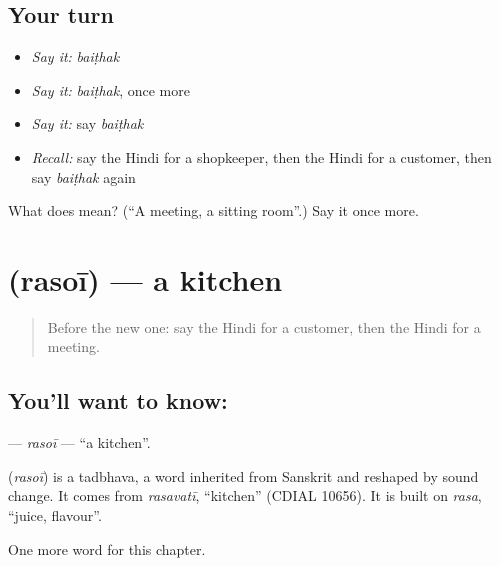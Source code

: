 \subsection*{Your turn}
\begin{itemize}
\raggedright
  \item \emph{Say it:} \emph{baiṭhak}
  \item \emph{Say it:} \emph{baiṭhak}, once more
  \item \emph{Say it:} say \emph{baiṭhak}
  \item \emph{Recall:} say the Hindi for a shopkeeper, then the Hindi for a customer, then say \emph{baiṭhak} again
\end{itemize}

\begin{tcolorbox}[breakable,colback=teal!4,colframe=teal!35!black,title={Before you move on}]
What does  mean? (\textquotedblleft{}A meeting, a sitting room\textquotedblright{}.) Say it once more.
\end{tcolorbox}
\section[\texorpdfstring{\hi{रसोई} (rasoī)}{रसोई (rasoī)}]{ (rasoī) — a kitchen}

\label{lesson:HI-C183-rasoi}



\begin{quote}
Before the new one: say the Hindi for a customer, then the Hindi for a meeting.
\end{quote}

\subsection*{You'll want to know: }
\textbf{} — \emph{rasoī} — \textquotedblleft{}a kitchen\textquotedblright{}.

\begin{cousinweb}
\textbf{} (\emph{rasoī}) is a tadbhava, a word inherited from Sanskrit and reshaped by sound change. It comes from \emph{rasavatī}, \textquotedblleft{}kitchen\textquotedblright{} (CDIAL 10656). It is built on \emph{rasa}, \textquotedblleft{}juice, flavour\textquotedblright{}.
\end{cousinweb}

\begin{grammarlens}[title={What you've built}]
One more word for this chapter.
\end{grammarlens}

